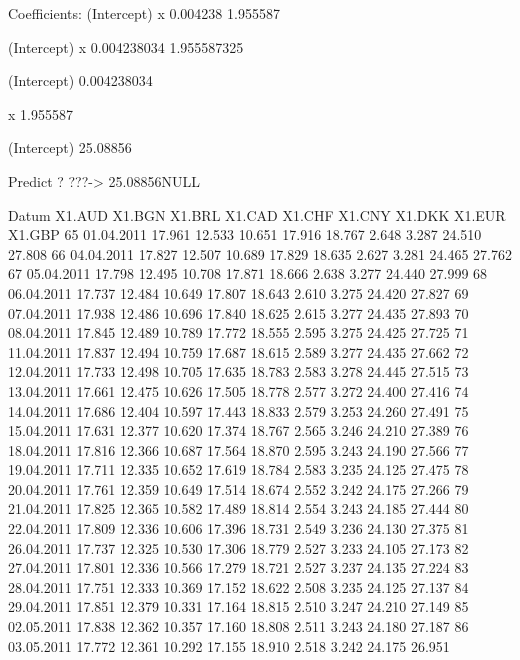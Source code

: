 \documentclass[a4paper,11pt]{scrartcl}
\begin{document}
\begin{Schunk}
\begin{Soutput}
Coefficients:
(Intercept)            x  
   0.004238     1.955587  
\end{Soutput}
\begin{Soutput}
(Intercept)           x 
0.004238034 1.955587325 
\end{Soutput}
\begin{Soutput}
(Intercept) 
0.004238034 
\end{Soutput}
\begin{Soutput}
       x 
1.955587 
\end{Soutput}
\begin{Soutput}
(Intercept) 
   25.08856 
\end{Soutput}
\begin{Soutput}
Predict ? ???-> 25.08856NULL
\end{Soutput}
\begin{Soutput}
         Datum X1.AUD X1.BGN X1.BRL X1.CAD X1.CHF X1.CNY X1.DKK X1.EUR X1.GBP
65  01.04.2011 17.961 12.533 10.651 17.916 18.767  2.648  3.287 24.510 27.808
66  04.04.2011 17.827 12.507 10.689 17.829 18.635  2.627  3.281 24.465 27.762
67  05.04.2011 17.798 12.495 10.708 17.871 18.666  2.638  3.277 24.440 27.999
68  06.04.2011 17.737 12.484 10.649 17.807 18.643  2.610  3.275 24.420 27.827
69  07.04.2011 17.938 12.486 10.696 17.840 18.625  2.615  3.277 24.435 27.893
70  08.04.2011 17.845 12.489 10.789 17.772 18.555  2.595  3.275 24.425 27.725
71  11.04.2011 17.837 12.494 10.759 17.687 18.615  2.589  3.277 24.435 27.662
72  12.04.2011 17.733 12.498 10.705 17.635 18.783  2.583  3.278 24.445 27.515
73  13.04.2011 17.661 12.475 10.626 17.505 18.778  2.577  3.272 24.400 27.416
74  14.04.2011 17.686 12.404 10.597 17.443 18.833  2.579  3.253 24.260 27.491
75  15.04.2011 17.631 12.377 10.620 17.374 18.767  2.565  3.246 24.210 27.389
76  18.04.2011 17.816 12.366 10.687 17.564 18.870  2.595  3.243 24.190 27.566
77  19.04.2011 17.711 12.335 10.652 17.619 18.784  2.583  3.235 24.125 27.475
78  20.04.2011 17.761 12.359 10.649 17.514 18.674  2.552  3.242 24.175 27.266
79  21.04.2011 17.825 12.365 10.582 17.489 18.814  2.554  3.243 24.185 27.444
80  22.04.2011 17.809 12.336 10.606 17.396 18.731  2.549  3.236 24.130 27.375
81  26.04.2011 17.737 12.325 10.530 17.306 18.779  2.527  3.233 24.105 27.173
82  27.04.2011 17.801 12.336 10.566 17.279 18.721  2.527  3.237 24.135 27.224
83  28.04.2011 17.751 12.333 10.369 17.152 18.622  2.508  3.235 24.125 27.137
84  29.04.2011 17.851 12.379 10.331 17.164 18.815  2.510  3.247 24.210 27.149
85  02.05.2011 17.838 12.362 10.357 17.160 18.808  2.511  3.243 24.180 27.187
86  03.05.2011 17.772 12.361 10.292 17.155 18.910  2.518  3.242 24.175 26.951

\end{Soutput}
\end{Schunk}
\end{document}
